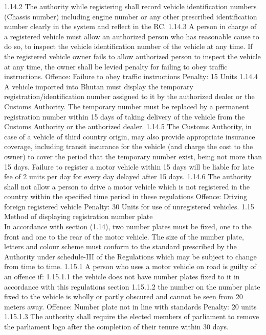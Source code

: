 \documentclass[
]{book}
\begin{document}
1.14.2 The authority while registering shall record vehicle identification numbers (Chassis number) including engine number or any other prescribed identification number clearly in the system and reflect in the RC.
1.14.3 A person in charge of a registered vehicle must allow an authorized person who has reasonable cause to do so, to inspect the vehicle identification number of the vehicle at any time. If the registered vehicle owner fails to allow authorized person to inspect the vehicle at any time, the owner shall be levied penalty for failing to obey traffic instructions.
Offence: Failure to obey traffic instructions
Penalty: 15 Units
1.14.4 A vehicle imported into Bhutan must display the temporary registration/identification number assigned to it by the authorized dealer or the Customs Authority. The temporary number must be replaced by a permanent registration number within 15 days of taking delivery of the vehicle from the Customs Authority or the authorized dealer.
1.14.5 The Customs Authority, in case of a vehicle of third country origin, may also provide appropriate insurance coverage, including transit insurance for the vehicle (and charge the cost to the owner) to cover the period that the temporary number exist, being not more than 15 days. Failure to register a motor vehicle within 15 days will be liable for late fee of 2 units per day for every day delayed after 15 days.
1.14.6 The authority shall not allow a person to drive a motor vehicle which is not registered in the country within the specified time period in these regulations
Offence: Driving foreign registered vehicle
Penalty: 30 Units for use of unregistered vehicles.
1.15 Method of displaying registration number plate\\
In accordance with section (1.14), two number plates must be fixed, one to the front and one to the rear of the motor vehicle. The size of the number plate, letters and colour scheme must conform to the standard prescribed by the Authority under schedule-III of the Regulations which may be subject to change from time to time.
1.15.1 A person who uses a motor vehicle on road is guilty of an offence if:
1.15.1.1 the vehicle does not have number plates fixed to it in accordance with this regulations section
1.15.1.2 the number on the number plate fixed to the vehicle is wholly or partly obscured and cannot be seen from 20 meters away.
Offence: Number plate not in line with standards
Penalty: 20 units
1.15.1.3 The authority shall require the elected members of parliament to remove the parliament logo after the completion of their tenure within 30 days.
\end{document}
